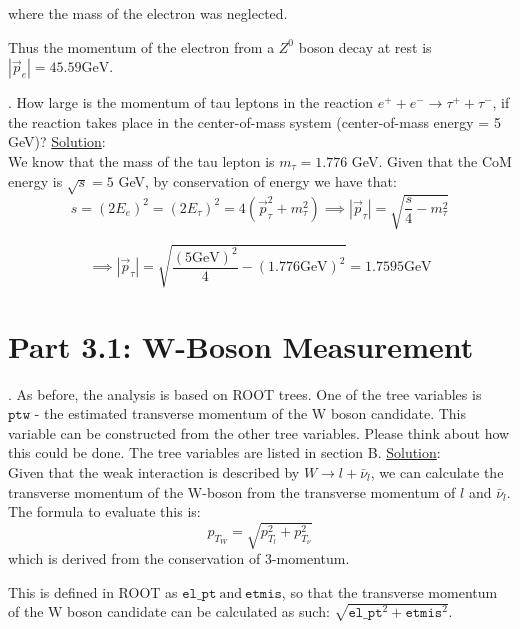\documentclass[a4paper]{report}
\numberwithin{equation}{section}
\begin{document}
\noindent where the mass of the electron was neglected. 

\noindent Thus the momentum of the electron from a $Z^0$ boson decay at rest is $|\vec{p}_e| = 45.59 \text{GeV}$. 

\bigbreak

. How large is the momentum of tau leptons in the reaction $e^+ + e^- \rightarrow \tau^+ + \tau^-$, if the reaction takes place in the center-of-mass system (center-of-mass energy = 5 GeV)?
\bigbreak
\noindent \underline{Solution}: \\
\noindent We know that the mass of the tau lepton is $m_\tau = 1.776$ GeV. Given that the CoM energy is $\sqrt{s} = 5$ GeV, by conservation of energy we have that:
$$s = (2 E_e)^2 = (2 E_\tau)^2 = 4 (\vec{p}_\tau^2 + m_\tau^2) \implies |\vec{p}_\tau| = \sqrt{\frac{s}{4} - m_\tau^2}$$

$$
\implies |\vec{p}_\tau| = \sqrt{\frac{(5 \text{GeV})^2}{4} - (1.776 \text{GeV})^2} = 1.7595 \text{GeV}
$$

\section{Part 3.1: W-Boson Measurement}

. As before, the analysis is based on ROOT trees. One of the tree variables is $\texttt{ptw -}$  the estimated transverse momentum of the W boson candidate. This variable can be constructed from the other tree variables. Please think about how this could be done. The tree variables are listed in section B.
\bigbreak
\noindent \underline{Solution}: \\
\noindent Given that the weak interaction is described by $W \rightarrow l + \bar{\nu}_l$, we can calculate the transverse momentum of the W-boson from the transverse momentum of $l$ and $\bar{\nu}_l$.  The formula to evaluate this is:
$$p_{T_W} = \sqrt{p_{T_l}^2 + p_{T_\nu}^2}  $$
which is derived from the conservation of 3-momentum.

\noindent This is defined in ROOT as $\texttt{el\_pt} \ \text{and} \ \texttt{etmis}$, so that the transverse momentum of the W boson candidate can be calculated as such: $\sqrt{\texttt{el\_{pt}}^2 + \texttt{etmis}^2}$.

\bigbreak 
\end{document}
